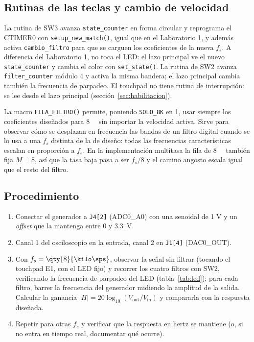 \documentclass[11pt,a4paper]{article}
\begin{document}
\subsection{Rutinas de las teclas y cambio de velocidad}

La rutina de SW3 avanza \texttt{state\_counter} en forma circular y
reprograma el CTIMER0 con \texttt{setup\_new\_match()}, igual que en el
Laboratorio 1, y además activa \texttt{cambio\_filtro} para que se carguen
los coeficientes de la nueva $f_s$. A diferencia del Laboratorio 1, no toca
el LED: el lazo principal ve el nuevo \texttt{state\_counter} y cambia el
color con \texttt{set\_state()}. La rutina de SW2 avanza
\texttt{filter\_counter} módulo 4 y activa la misma bandera; el lazo
principal cambia también la frecuencia de parpadeo. El touchpad no tiene
rutina de interrupción: se lee desde el lazo principal
(sección~\ref{sec:habilitacion}).

La macro \texttt{FILA\_FILTRO()} permite, poniendo \texttt{SOLO\_8K} en 1,
usar siempre los coeficientes diseñados para \qty{8}{\kilo\sps} sin importar
la velocidad activa. Sirve para observar cómo se desplazan en frecuencia las
bandas de un filtro digital cuando se lo usa a una $f_s$ distinta de la de
diseño: todas las frecuencias características escalan en proporción a $f_s$.
En la implementación multitasa la fila de \qty{8}{\kilo\sps} también fija
$M = 8$, así que la tasa baja pasa a ser $f_s/8$ y el camino angosto escala
igual que el resto del filtro.

\label{sec:verificacion}

\subsection{Procedimiento}

\begin{enumerate}[nosep]
  \item Conectar el generador a \texttt{J4[2]} (ADC0\_A0) con una senoidal
        de 1 V y un \emph{offset} que la mantenga entre 0 y
        \qty{3.3} V.
  \item Canal 1 del osciloscopio en la entrada, canal 2 en \texttt{J1[4]}
        (DAC0\_OUT).
  \item Con $f_s = \qty{8}{\kilo\sps}$, observar la señal sin filtrar
        (tocando el touchpad E1, con el LED fijo) y recorrer los cuatro
        filtros con SW2, verificando la frecuencia de parpadeo del LED
        (tabla~\ref{tab:led}); para cada filtro, barrer la frecuencia del generador midiendo la
        amplitud de la salida. Calcular la ganancia
        $|H| = 20\log_{10}(V_{\text{out}}/V_{\text{in}})$ y compararla con la
        respuesta diseñada.
  \item Repetir para otras $f_s$ y verificar que la respuesta en hertz se
        mantiene (o, si no entra en tiempo real, documentar qué ocurre).
\end{enumerate}
\end{document}
